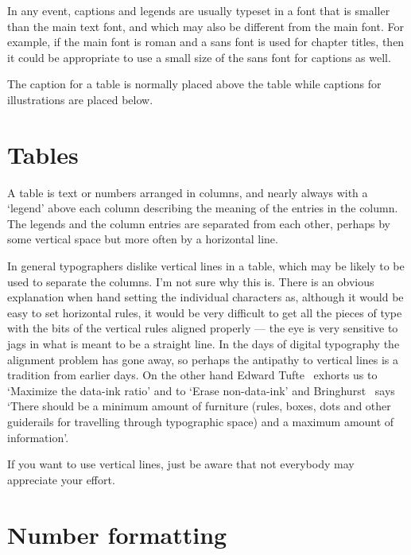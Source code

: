 \documentclass[10pt,letterpaper,extrafontsizes]{memoir}
\begin{document}
    In any event, captions and legends are usually typeset in a font that
is smaller than the main text font, and which may also be different from the
main font. For example, if the main font is roman and a sans font is used
for chapter titles, then it could be appropriate to use a small size
of the sans font for captions as well.

    The caption for a table is normally placed above the 
table while captions for illustrations are placed below.


\section{Tables}


    A table is text or numbers arranged in columns, 
and nearly always
with a `legend' above each column describing the meaning of
the entries in the column. The legends and the column entries are
separated from each other, perhaps by some vertical space but more often
by a horizontal line.

    In general typographers dislike vertical lines in a table, which may
be likely to be used to separate the columns. I'm not sure why this is.
There is an obvious explanation when hand setting the individual characters
as, although it would be easy to set horizontal rules, it would be very 
difficult to get all the pieces of type with the bits of the vertical rules
aligned properly --- the eye is very sensitive to jags in what is meant to
be a straight line. In the days of digital typography the alignment problem
has gone away, so perhaps the antipathy to vertical lines is a tradition
from earlier days. On the other hand Edward Tufte~\autocite[p. 96]{TUFTE83} 
exhorts us to `Maximize the data-ink ratio' and to `Erase non-data-ink'
and Bringhurst~\autocite[p. 70]{BRINGHURST99} says `There should be a minimum
amount of furniture (rules, boxes, dots and other guiderails for
travelling through typographic space) and a maximum amount
of information'.

    If you want to use vertical lines, just be aware that not everybody
may appreciate your effort.



\section{Number formatting}
\end{document}
